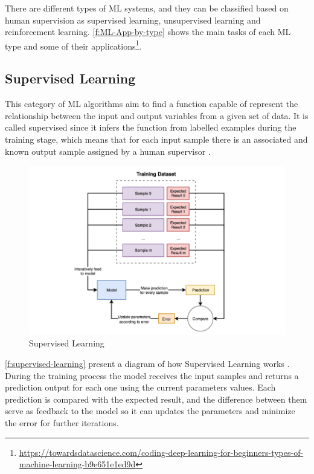 There are different types of \ac{ML} systems, and they can be classified based on human supervision as supervised learning, unsupervised learning and reinforcement learning. \autoref{f:ML-App-by-type} shows the main tasks of each \ac{ML} type and some of their applications\footnote{\url{https://towardsdatascience.com/coding-deep-learning-for-beginners-types-of-machine-learning-b9e651e1ed9d}}.

\subsection{Supervised Learning}
This category of \ac{ML} algorithms aim to find a function capable of represent the relationship between the input and output variables from a given set of data. It is called supervised since it infers the function from labelled examples during the training stage, which means that for each input sample there is an associated and known output sample assigned by a human supervisor \cite{Batta2020}.

\begin{figure}[h]
\centering
\includegraphics[width=\linewidth]{figures/Ch2/Supervised-Learning.png}
\caption{Supervised Learning}
\label{f:supervised-learning}
\end{figure}

\autoref{f:supervised-learning} present a diagram of how Supervised Learning works%
. During the training process the model receives the input samples and returns a prediction output for each one using the current parameters values. Each prediction is compared with the expected result, and the difference between them serve as feedback to the model so it can updates the parameters and minimize the error for further iterations.

